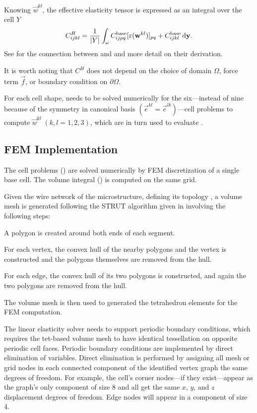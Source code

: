 \documentclass[twocolumn,10pt]{article}
\begin{document}
Knowing $\vec{w}^{kl}$, the effective elasticity tensor is expressed
as an integral over the cell $Y$
\begin{equation}
  \label{eqn:effective}
  C^H_{ijkl} = \frac{1}{|Y|} \int_\omega C_{ijpq}^\text{base}[\varepsilon(\mathbf w^{kl})]_{pq} + C_{ijkl}^\text{base} \, \mathrm{d} \mathbf y.
\end{equation}
See  for the connection between  and
 and more detail on their derivation.

It is worth noting that $C^H$ does not depend on the choice of domain
$\Omega$, force term $\vec{f}$, or boundary condition on $\partial
\Omega$.

For each cell shape,  needs to be solved numerically for
the six---instead of nine because of the symmetry in canonical basis
$(\vec{e}^{kl} = \vec{e}^{lk})$---cell problems to compute
$\vec{w}^{kl}\;(k,l=1,2,3)$, which are in turn used to evaluate
.

\subsection{FEM Implementation}
The cell problems () are solved numerically by FEM
discretization of a single base cell. The volume integral
() is computed on the same grid.

Given the wire network of the microstructure, defining its topology
, a volume mesh is generated following the STRUT
algorithm given in \cite{hart2008sculptural} involving the following
steps:\begin{inparaenum}[(i)]
\item A polygon is created around both ends of each segment.
\item For each vertex, the convex hull of the nearby polygons and the
  vertex is constructed and the polygons themselves are removed from
  the hull.
\item For each edge, the convex hull of its two polygons is
  constructed, and again the two polygons are removed from the hull.
\end{inparaenum}
The volume mesh is then used to generated the tetrahedron elements for
the FEM computation.

The linear elasticity solver needs to support periodic boundary
conditions, which requires the tet-based volume mesh to have identical
tessellation on opposite periodic cell faces. Periodic boundary
conditions are implemented by direct elimination of variables. Direct
elimination is performed by assigning all mesh or grid nodes in each
connected component of the identified vertex graph the same degrees of
freedom. For example, the cell's corner nodes---if they exist---appear
as the graph's only component of size 8 and all get the same $x$, $y$,
and $z$ displacement degrees of freedom. Edge nodes will appear in a
component of size 4.
\end{document}
